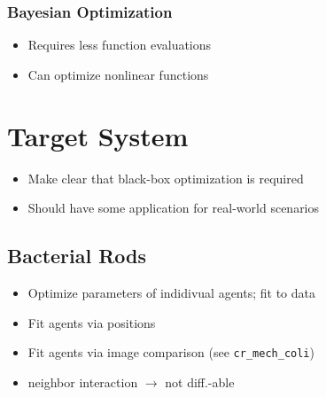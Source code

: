 \documentclass{article}
\begin{document}
\subsubsection*{Bayesian Optimization}
\begin{itemize}
    \item Requires less function evaluations
    \item Can optimize nonlinear functions
\end{itemize}

\section{Target System}
\label{section:target-system}
\begin{itemize}
    \item Make clear that black-box optimization is required
    \item Should have some application for real-world scenarios
\end{itemize}

\subsection{Bacterial Rods}
\label{subsection:bacterial-rods}
\begin{itemize}
    \item Optimize parameters of indidivual agents; fit to data
    \item Fit agents via positions
    \item Fit agents via image comparison (see \texttt{cr\_mech\_coli})
    \item neighbor interaction $\rightarrow$ not diff.-able
\end{itemize}
\end{document}
